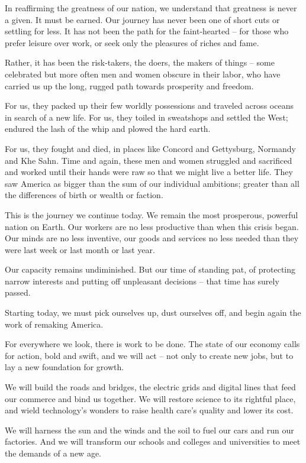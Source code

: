 In reaffirming the greatness of our nation, we understand that greatness is never a given. It must be earned. Our journey has never been one of short 
cuts or settling for less. It has not been the path for the faint-hearted – for those who prefer leisure over work, or seek only the pleasures of riches and fame.

Rather, it has been the risk-takers, the doers, the makers of things – some celebrated but more often men and women obscure in their labor, who have 
carried us up the long, rugged path towards prosperity and freedom.

For us, they packed up their few worldly possessions and traveled across oceans in search of a new life. For us, they toiled in sweatshops and settled the 
West; endured the lash of the whip and plowed the hard earth.

For us, they fought and died, in places like Concord and Gettysburg, Normandy and Khe Sahn. Time and again, these men and women struggled and 
sacrificed and worked until their hands were raw so that we might live a better life. They saw America as bigger than the sum of our individual ambitions; 
greater than all the differences of birth or wealth or faction.


This is the journey we continue today. We remain the most prosperous, powerful nation on Earth. Our workers are no less productive than when this 
crisis began. Our minds are no less inventive, our goods and services no less needed than they were last week or last month or last year.

Our capacity remains undiminished. But our time of standing pat, of protecting narrow interests and putting off unpleasant decisions – that time has 
surely passed.

Starting today, we must pick ourselves up, dust ourselves off, and begin again the work of remaking America.

For everywhere we look, there is work to be done. The state of our economy calls for action, bold and swift, and we will act – not only to create new jobs, 
but to lay a new foundation for growth.


We will build the roads and bridges, the electric grids and digital lines that feed our commerce and bind us together. We will restore science to its rightful 
place, and wield technology’s wonders to raise health care’s quality and lower its cost.

We will harness the sun and the winds and the soil to fuel our cars and run our factories. And we will transform our schools and colleges and universities to 
meet the demands of a new age.

